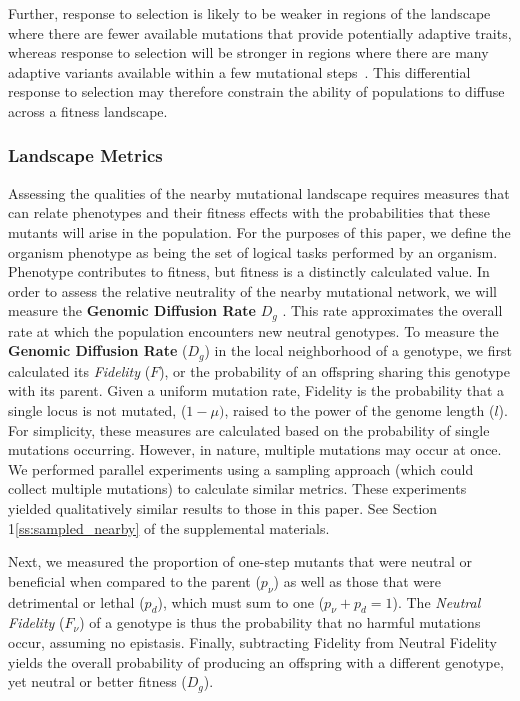 \documentclass[10pt,letterpaper,final]{article}
\begin{document}
Further, response to selection is likely to be weaker in regions of the landscape where there are fewer available mutations that provide potentially adaptive traits, whereas response to selection will be stronger in regions where there are many adaptive variants available within a few mutational steps~\cite{alberch_genes_1991,carter_role_2005}. This differential response to selection may therefore constrain the ability of populations to diffuse across a fitness landscape.

\subsubsection*{Landscape Metrics}
Assessing the qualities of the nearby mutational landscape requires measures that can relate phenotypes and their fitness effects with the probabilities that these mutants will arise in the population. For the purposes of this paper, we define the organism phenotype as being the set of logical tasks performed by an organism. Phenotype contributes to fitness, but fitness is a distinctly calculated value. In order to assess the relative neutrality of the nearby mutational network, we will measure the \textbf{Genomic Diffusion Rate} $D_g$ \cite{ofria_evolution_2002}. This rate approximates the overall rate at which the population encounters new neutral genotypes.
To measure the \textbf{Genomic Diffusion Rate} ($D_g$) in the local neighborhood of a genotype, we first calculated its \textit{Fidelity} ($F$), or the probability of an offspring sharing this genotype with its parent.  Given a uniform mutation rate, Fidelity is the probability that a single locus is not mutated, ($1-\mu)$, raised to the power of the genome length ($l$). For simplicity, these measures are calculated based on the probability of single mutations occurring. However, in nature, multiple mutations may occur at once. We performed parallel experiments using a sampling approach (which could collect multiple mutations) to calculate similar metrics. These experiments yielded qualitatively similar results to those in this paper. See Section 1\ref{ss:sampled_nearby} of the supplemental materials.


Next, we measured the proportion of one-step mutants that were neutral or beneficial when compared to the parent ($p_\nu$) as well as those that were detrimental or lethal ($p_d$), which must sum to one ($p_\nu + p_d = 1$).  The \textit{Neutral Fidelity} ($F_\nu$) of a genotype is thus the probability that no harmful mutations occur, assuming no epistasis. Finally, subtracting Fidelity from Neutral Fidelity yields the overall probability of producing an offspring with a different genotype, yet neutral or better fitness ($D_g$).
\end{document}
